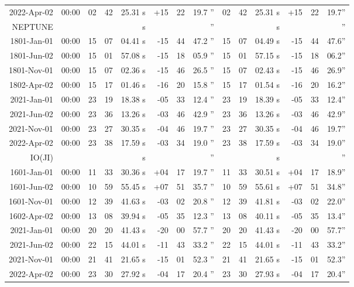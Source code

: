 \begin{longtable}{r@{\,}r|r@{h\,}r@{m\,}r<{s}|r@{°\,}r@{'\,}r<{''}||r@{h\,}r@{m\,}r<{s}|r@{°\,}r@{'\,}r<{''}}
 2022-Apr-02 & 00:00  &   02 & 42 & 25.31 & +15 & 22 & 19.7 & 02&42&25.31 & +15&22&19.7\\ %
NEPTUNE     \\
 1801-Jan-01 & 00:00  &   15 & 07 & 04.41 & -15 & 44 & 47.2 & 15&07&04.49 & -15&44&47.6\\ %
 1801-Jun-02 & 00:00  &   15 & 01 & 57.08 & -15 & 18 & 05.9 & 15&01&57.15 & -15&18&06.2\\ %
 1801-Nov-01 & 00:00  &   15 & 07 & 02.36 & -15 & 46 & 26.5 & 15&07&02.43 & -15&46&26.9\\ %
 1802-Apr-02 & 00:00  &   15 & 17 & 01.46 & -16 & 20 & 15.8 & 15&17&01.54 & -16&20&16.2\\ %
 2021-Jan-01 & 00:00  &   23 & 19 & 18.38 & -05 & 33 & 12.4 & 23&19&18.39 & -05&33&12.4\\ %
 2021-Jun-02 & 00:00  &   23 & 36 & 13.26 & -03 & 46 & 42.9 & 23&36&13.26 & -03&46&42.9\\ %
 2021-Nov-01 & 00:00  &   23 & 27 & 30.35 & -04 & 46 & 19.7 & 23&27&30.35 & -04&46&19.7\\ %
 2022-Apr-02 & 00:00  &   23 & 38 & 17.59 & -03 & 34 & 19.0 & 23&38&17.59 & -03&34&19.0\\ %
IO(JI)    \\
 1601-Jan-01 & 00:00  &   11 & 33 & 30.36 & +04 & 17 & 19.7 & 11&33&30.51 & +04&17&18.9\\ %
 1601-Jun-02 & 00:00  &   10 & 59 & 55.45 & +07 & 51 & 35.7 & 10&59&55.61 & +07&51&34.8\\ %
 1601-Nov-01 & 00:00  &   12 & 39 & 41.63 & -03 & 02 & 20.8 & 12&39&41.81 & -03&02&22.0\\ %
 1602-Apr-02 & 00:00  &   13 & 08 & 39.94 & -05 & 35 & 12.3 & 13&08&40.11 & -05&35&13.4\\ %
 2021-Jan-01 & 00:00  &   20 & 20 & 41.43 & -20 & 00 & 57.7 & 20&20&41.43 & -20&00&57.7\\ %
 2021-Jun-02 & 00:00  &   22 & 15 & 44.01 & -11 & 43 & 33.2 & 22&15&44.01 & -11&43&33.2\\ %
 2021-Nov-01 & 00:00  &   21 & 41 & 21.65 & -15 & 01 & 52.3 & 21&41&21.65 & -15&01&52.3\\ %
 2022-Apr-02 & 00:00  &   23 & 30 & 27.92 & -04 & 17 & 20.4 & 23&30&27.93 & -04&17&20.4\\ %

\end{longtable}
